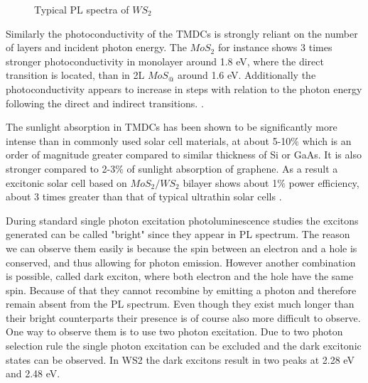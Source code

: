 	\begin{figure}[h]
	\begin{center}
	\caption{Typical PL spectra of $WS_2$}
	\label{fig:WS2TypicalPLSpectra}
	\end{center}
	\end{figure}
		
	Similarly the photoconductivity of the TMDCs is strongly reliant on the number of layers and incident photon energy. The $MoS_2$ for instance shows 3 times stronger photoconductivity in monolayer around 1.8 eV, where the direct transition is located, than in 2L $MoS_@$ around 1.6 eV. Additionally the photoconductivity appears to increase in steps with relation to the photon energy following the direct and indirect transitions. \cite{ElectronicsAndOptoelectronicsOfTwo-dimensionalTransitionMetalDichalcogenides}.
		
	The sunlight absorption in TMDCs has been shown to be significantly more intense than in commonly used solar cell materials, at about 5-10$\%$ which is an order of magnitude greater compared to similar thickness of Si or GaAs. It is also stronger compared to 2-3$\%$ of sunlight absorption of graphene. As a result a excitonic solar cell based on $MoS_2/WS_2$ bilayer shows about 1$\%$ power efficiency, about 3 times greater than that of typical ultrathin solar cells \cite{ExtraordinarySunlightAbsorptionAndOneNanometerThickPhotovoltaicsUsingTwo-DimensionalMonolayerMaterials}.
	
	During standard single photon excitation photoluminescence studies the excitons generated can be called "bright" since they appear in PL spectrum. The reason we can observe them easily is because the spin between an electron and a hole is conserved, and thus allowing for photon emission. However another combination is possible, called dark exciton, where both electron and the hole have the same spin. Because of that they cannot recombine by emitting a photon and therefore remain absent from the PL spectrum. Even though they exist much longer than their bright counterparts their presence is of course also more difficult to observe. One way to observe them is to use two photon excitation. Due to two photon selection rule the single photon excitation can be excluded and the dark excitonic states can be observed. In WS2 the dark excitons result in two peaks at 2.28 eV and 2.48 eV. \cite{Ye2014}
	
